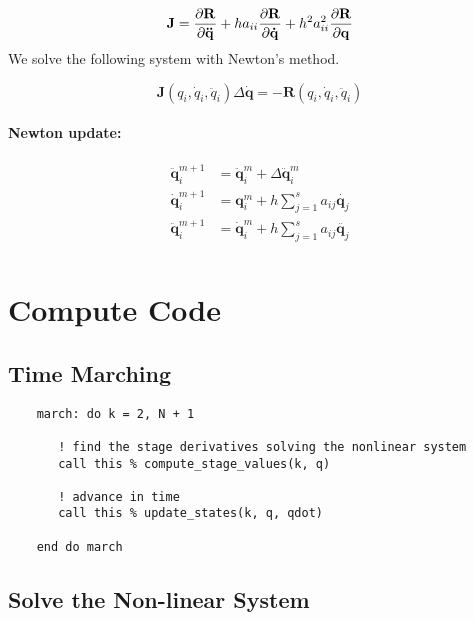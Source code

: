 \documentclass[pdftex,11pt,letter]{article}
\begin{document}
\begin{equation}
  \mathbf{J} = \dfrac{\partial \mathbf{R}}{\partial \mathbf{\ddot{q}}} + h a_{ii}
  \dfrac{\partial \mathbf{R}}{\partial \mathbf{\dot{q}}} + h^2 a_{ii}^2
  \dfrac{\partial \mathbf{R}}{\partial \mathbf{{q}}}
\end{equation}
We solve the following system with Newton's method.

\begin{equation}
 \mathbf{J} \left(q_i,\dot{q}_i,\ddot{q}_i\right) \Delta\mathbf{\dot{q}} = -\mathbf{R}  \left(q_i,\dot{q}_i,\ddot{q}_i\right)
\end{equation}

\paragraph{Newton update:}

\begin{equation}
  \begin{split}
    \ddot{\mathbf{q}}_i^{m+1} & = \ddot{\mathbf{q}}_i^{m}  + \Delta \ddot{\mathbf{q}}_i^m\\
    \dot{\mathbf{q}}_i^{m+1} & = {\mathbf{q}}_i^{m}  + h \sum_{j=1}^s a_{ij} \dot{\mathbf{q}_j}\\
    \ddot{\mathbf{q}}_i^{m+1} & = \dot{\mathbf{q}}_i^{m}  + h \sum_{j=1}^s a_{ij} \ddot{\mathbf{q}_j}\\
  \end{split}
\end{equation}

\clearpage

\appendix
\section{Compute Code}

\subsection{Time Marching}

\begin{verbatim}
    march: do k = 2, N + 1

       ! find the stage derivatives solving the nonlinear system
       call this % compute_stage_values(k, q)
        
       ! advance in time
       call this % update_states(k, q, qdot)

    end do march
\end{verbatim}


\subsection{Solve the Non-linear System}
\end{document}
